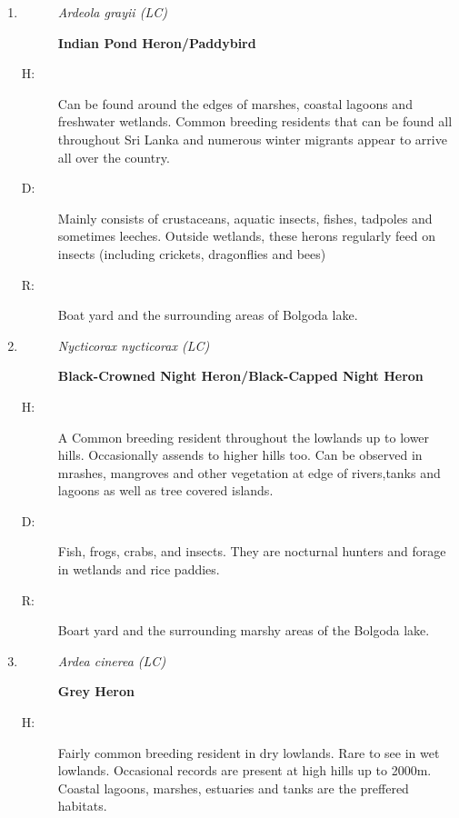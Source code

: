 \begin{itemize}
\begin{enumerate}
\item%
\begin{description}%
\item[]%
\textit{Ardeola grayii (LC)}%
\item[]%
\textbf{Indian Pond Heron/Paddybird}%
\end{description}%
\begin{description}%
\item[H: ]%
Can be found around the edges of marshes, coastal lagoons and freshwater wetlands. Common breeding residents that can be found all throughout Sri Lanka and numerous winter migrants appear to arrive all over the country. %
\item[D: ]%
Mainly consists of crustaceans, aquatic insects, fishes, tadpoles and sometimes leeches. Outside wetlands, these herons regularly feed on insects (including crickets, dragonflies and bees)%
\item[R: ]%
Boat yard and the surrounding areas of Bolgoda lake.%
\end{description}%
\item%
\begin{description}%
\item[]%
\textit{Nycticorax nycticorax (LC)}%
\item[]%
\textbf{Black{-}Crowned Night Heron/Black{-}Capped Night Heron}%
\end{description}%
\begin{description}%
\item[H: ]%
A Common breeding resident throughout the lowlands  up to lower hills. Occasionally assends to higher hills too. Can be observed in mrashes, mangroves and other vegetation at edge of rivers,tanks and lagoons as well as tree covered islands.%
\item[D: ]%
Fish, frogs, crabs, and insects. They are nocturnal hunters and forage in wetlands and rice paddies.%
\item[R: ]%
Boart yard and the surrounding marshy areas of the Bolgoda lake. %
\end{description}%
\item%
\begin{description}%
\item[]%
\textit{Ardea cinerea (LC)}%
\item[]%
\textbf{Grey Heron}%
\end{description}%
\begin{description}%
\item[H: ]%
Fairly common breeding resident in dry lowlands. Rare to see in wet lowlands. Occasional records are present at high hills up to 2000m. Coastal lagoons, marshes, estuaries and tanks are the preffered habitats.%

\end{description}
\end{enumerate}
\end{itemize}
